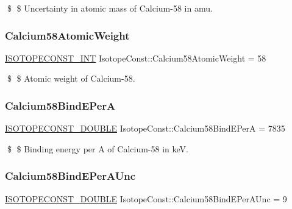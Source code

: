 \$ \$ Uncertainty in atomic mass of Calcium-\/58 in amu. \mbox{\label{group___isotope_const-_calcium-_ca58_gac7a2c5c1bbdb2016b49f13c91426f200}} 
\subsubsection{\texorpdfstring{Calcium58\+Atomic\+Weight}{Calcium58AtomicWeight}}
{\footnotesize\ttfamily \mbox{\hyperlink{group___isotope_const-_macros_ga5f18360b3e99483a35c32d789e62621c}{I\+S\+O\+T\+O\+P\+E\+C\+O\+N\+S\+T\+\_\+\+I\+NT}} Isotope\+Const\+::\+Calcium58\+Atomic\+Weight = 58}

\$ \$ Atomic weight of Calcium-\/58. \mbox{\label{group___isotope_const-_calcium-_ca58_gac702460e686fe9ed27dc34c616cd85d5}} 
\subsubsection{\texorpdfstring{Calcium58\+Bind\+E\+PerA}{Calcium58BindEPerA}}
{\footnotesize\ttfamily \mbox{\hyperlink{group___isotope_const-_macros_ga8f45a7272ce02c0b4c65c44636ed719a}{I\+S\+O\+T\+O\+P\+E\+C\+O\+N\+S\+T\+\_\+\+D\+O\+U\+B\+LE}} Isotope\+Const\+::\+Calcium58\+Bind\+E\+PerA = 7835}

\$ \$ Binding energy per A of Calcium-\/58 in keV. \mbox{\label{group___isotope_const-_calcium-_ca58_ga0b563db9e0538ebe158219bada1bb135}} 
\subsubsection{\texorpdfstring{Calcium58\+Bind\+E\+Per\+A\+Unc}{Calcium58BindEPerAUnc}}
{\footnotesize\ttfamily \mbox{\hyperlink{group___isotope_const-_macros_ga8f45a7272ce02c0b4c65c44636ed719a}{I\+S\+O\+T\+O\+P\+E\+C\+O\+N\+S\+T\+\_\+\+D\+O\+U\+B\+LE}} Isotope\+Const\+::\+Calcium58\+Bind\+E\+Per\+A\+Unc = 9}

